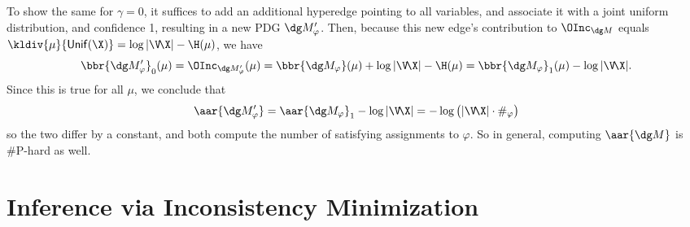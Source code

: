 \begin{lproof}
    To show the same for $\gamma = 0$, it suffices to add an additional hyperedge pointing to all variables, and associate it with a joint uniform distribution, and confidence 1, resulting in a new PDG $\dg M_\varphi'$.
    Then, because this new edge's contribution to $\OInc_{\dg M}$
    equals $\kldiv{\mu}{\mathsf{Unif}(\X)} = \log |\V\!\X| - \H(\mu)$,
    we have
    \[
        \bbr{\dg M_\varphi'}_0(\mu)
            = \OInc_{\dg M_\varphi'}(\mu)
            = \bbr{\dg M_\varphi}(\mu) + \log | \V\!\X | - \H(\mu)
            = \bbr{\dg M_\varphi}_{1}(\mu) - \log |\V\!\X |.
    \]
    Since this is true for all $\mu$, we conclude that
    \[
        \aar{\dg M_\varphi'} = \aar{\dg M_\varphi}_1 - \log |\V\!\X| = -\log \big( |\V\!\X|\cdot \#_\varphi \big)
    \]
    so the two differ by a constant, and both compute the number of satisfying assignments to $\varphi$. So in general, computing $\aar{\dg M}$ is \#P-hard as well.
\end{lproof}



\section{Inference via Inconsistency Minimization}
    \label{sec:inf-via-inc}

